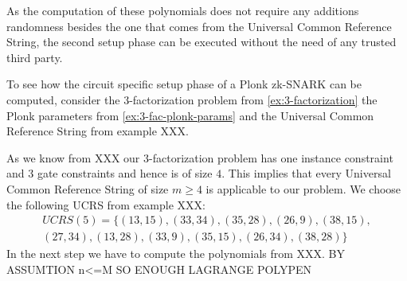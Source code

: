 As the computation of these polynomials does not require any additions randomness besides the one that comes from the Universal Common Reference String, the second setup phase can be executed without the need of any trusted third party.

\begin{example}
\label{ex:3-fac-CSCRS}
To see how the circuit specific setup phase of a Plonk zk-SNARK can be computed, consider the $3$-factorization problem from \ref{ex:3-factorization} the Plonk parameters from \examplename{} \ref{ex:3-fac-plonk-params} and the Universal Common Reference String from example XXX. 

As we know from XXX our $3$-factorization problem has one instance constraint and $3$ gate constraints and hence is of size $4$. This implies that every Universal Common Reference String of size $m\geq 4$ is applicable to our problem. We choose the following UCRS from example XXX:
\begin{multline*}
UCRS(5) =\{(13,15), (33,34), (35,28), (26,9), (38,15), \\
(27,34), (13,28), (33,9), (35,15), (26,34), (38,28)\}
\end{multline*}
In the next step we have to compute the polynomials from XXX. BY ASSUMTION n<=M SO ENOUGH LAGRANGE POLYPEN


\end{example}
